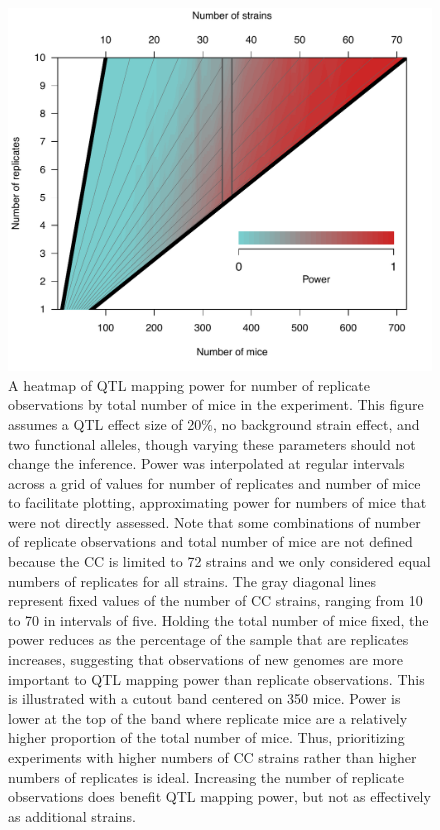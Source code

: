 \begin{figure}
\renewcommand{\familydefault}{\sfdefault}\normalfont
\centering
\includegraphics[width=\textwidth, trim={0in 0.1in 0in 0in}, clip]{figures/3-sparcc/power_heatmap_process.pdf}
\caption[Heatmap of power by number of replicate observations and total mice in experiment]{A heatmap of QTL mapping power for number of replicate observations by total number of mice in the experiment. This figure assumes a QTL effect size of 20\%, no background strain effect, and two functional alleles, though varying these parameters should not change the inference. Power was interpolated at regular intervals across a grid of values for number of replicates and number of mice to facilitate plotting, approximating power for numbers of mice that were not directly assessed. Note that some combinations of number of replicate observations and total number of mice are not defined because the CC is limited to 72 strains and we only considered equal numbers of replicates for all strains. The gray diagonal lines represent fixed values of the number of CC strains, ranging from 10 to 70 in intervals of five. Holding the total number of mice fixed, the power reduces as the percentage of the sample that are replicates increases, suggesting that observations of new genomes are more important to QTL mapping power than replicate observations. This is illustrated with a cutout band centered on 350 mice. Power is lower at the top of the band where replicate mice are a relatively higher proportion of the total number of mice. Thus, prioritizing experiments with higher numbers of CC strains rather than higher numbers of replicates is ideal. Increasing the number of replicate observations does benefit QTL mapping power, but not as effectively as additional strains.\label{fig:heatmap}}
\end{figure}

